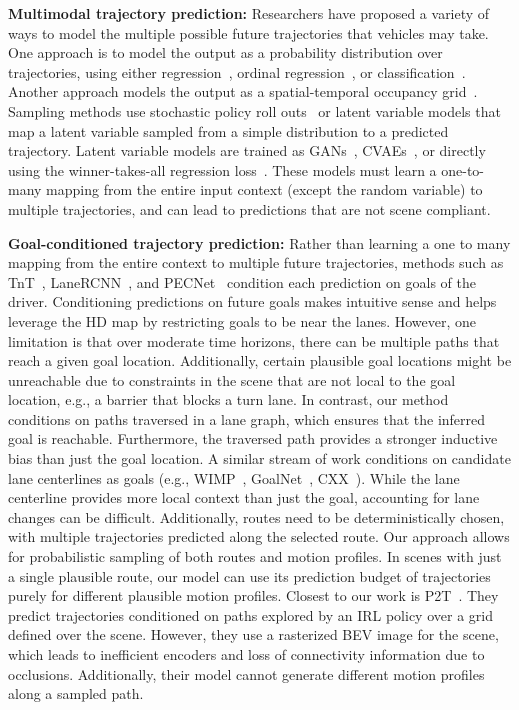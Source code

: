 \documentclass{article}
\begin{document}
\textbf{Multimodal trajectory prediction:} Researchers have proposed a variety of ways to model the multiple possible future trajectories that vehicles may take.
One approach is to model the output as a probability distribution over trajectories, using either regression~\citep{cui2019multimodal}, ordinal regression~\citep{chai2019multipath}, or classification~\citep{phan2019cover-net}.
Another approach models the output as a spatial-temporal occupancy grid~\citep{zeng2019costmap}.
Sampling methods use stochastic policy roll outs~\citep{rhinehart2018r2p2, rhinehart2019precog} or latent variable models that map a latent variable sampled from a simple distribution to a predicted trajectory. Latent variable models are trained as GANs~\citep{gupta2018socialGAN, zhao2019multi}, CVAEs~\citep{lee2017desire, salzmann2020trajectron++}, or directly using the winner-takes-all regression loss~\citep{Makansi_2019_CVPR}.
These models must learn a one-to-many mapping from the entire input context (except the random variable) to multiple trajectories, and can lead to predictions that are not scene compliant. 

\textbf{Goal-conditioned trajectory prediction:} Rather than learning a one to many mapping from the entire context to multiple future trajectories, methods such as TnT~\citep{zhao2020tnt}, LaneRCNN~\citep{zeng2021laneRcnn}, and PECNet~\citep{mangalam2020PecNet} condition each prediction on goals of the driver.
Conditioning predictions on future goals makes intuitive sense and helps leverage the HD map by restricting goals to be near the lanes.
However, one limitation is that over moderate time horizons, there can be multiple paths that reach a given goal location.
Additionally, certain plausible goal locations might be unreachable due to constraints in the scene that are not local to the goal location, e.g., a barrier that blocks a turn lane.
In contrast, our method conditions on paths traversed in a lane graph, which ensures that the inferred goal is reachable. 
Furthermore, the traversed path provides a stronger inductive bias than just the goal location. A similar stream of work conditions on candidate lane centerlines as goals (e.g., WIMP~\citep{khandelwal2020whatif}, GoalNet~\citep{zhang2020map}, CXX~\citep{luo2020probabilistic}).
While the lane centerline provides more local context than just the goal, accounting for lane changes can be difficult. 
Additionally, routes need to be deterministically chosen, with multiple trajectories predicted along the selected route. 
Our approach allows for probabilistic sampling of both routes and motion profiles. 
In scenes with just a single plausible route, our model can use its prediction budget of  trajectories purely for different plausible motion profiles.  Closest to our work is P2T~\citep{deo2021p2t}.
They predict trajectories conditioned on paths explored by an IRL policy over a grid defined over the scene. 
However, they use a rasterized BEV image for the scene, which leads to inefficient encoders and loss of connectivity information due to occlusions. 
Additionally, their model cannot generate different motion profiles along a sampled path.
\end{document}
